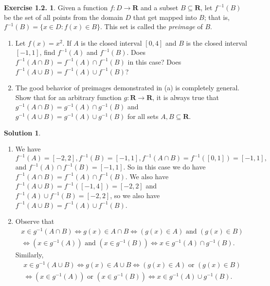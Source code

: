 \documentclass[12pt]{article}
\theoremstyle{definition}
\theoremstyle{exercise}
\newtheorem{exercise}{Exercise 1.2.}
\theoremstyle{solution}
\newtheorem*{solution}{Solution}
\begin{document}
\begin{exercise}
\label{ex:9}
    Given a function \( f : D \to \mathbf{R} \) and a subset \( B \subseteq \mathbf{R} \), let \( f^{-1}(B) \) be the set of all points from the domain \( D \) that get mapped into \( B \); that is, \( f^{-1}(B) = \{ x \in D : f(x) \in B \} \). This set is called the \textit{preimage} of \( B \).
    \begin{enumerate}[label = (\alph*)]
        \item Let \( f(x) = x^2 \). If \( A \) is the closed interval \( [0, 4] \) and \( B \) is the closed interval \( [-1, 1] \), find \( f^{-1}(A) \) and \( f^{-1}(B) \). Does \( f^{-1}(A \cap B) = f^{-1}(A) \cap f^{-1}(B) \) in this case? Does \( f^{-1}(A \cup B) = f^{-1}(A) \cup f^{-1}(B) \)?

        \item The good behavior of preimages demonstrated in (a) is completely general. Show that for an arbitrary function \( g : \mathbf{R} \to \mathbf{R} \), it is always true that \( g^{-1}(A \cap B) = g^{-1}(A) \cap g^{-1}(B) \) and \( g^{-1}(A \cup B) = g^{-1}(A) \cup g^{-1}(B) \) for all sets \( A, B \subseteq \mathbf{R} \).
    \end{enumerate}
\end{exercise}

\begin{solution}
    \begin{enumerate}[label = (\alph*)]
        \item We have \( f^{-1}(A) = [-2, 2], f^{-1}(B) = [-1, 1], f^{-1}(A \cap B) = f^{-1}([0, 1]) = [-1, 1], \) and \( f^{-1}(A) \cap f^{-1}(B) = [-1, 1] \). So in this case we do have \( f^{-1}(A \cap B) = f^{-1}(A) \cap f^{-1}(B) \). We also have \( f^{-1}(A \cup B) = f^{-1}([-1, 4]) = [-2, 2] \) and \( f^{-1}(A) \cup f^{-1}(B) = [-2, 2] \), so we also have \( f^{-1}(A \cup B) = f^{-1}(A) \cup f^{-1}(B) \).

        \item Observe that
        \begin{gather*}
            x \in g^{-1}(A \cap B) \iff g(x) \in A \cap B \iff (g(x) \in A) \text{ and } (g(x) \in B) \\
            \iff (x \in g^{-1}(A)) \text{ and } (x \in g^{-1}(B)) \iff x \in g^{-1}(A) \cap g^{-1}(B).
        \end{gather*}
        Similarly,
        \begin{gather*}
            x \in g^{-1}(A \cup B) \iff g(x) \in A \cup B \iff (g(x) \in A) \text{ or } (g(x) \in B) \\
            \iff (x \in g^{-1}(A)) \text{ or } (x \in g^{-1}(B)) \iff x \in g^{-1}(A) \cup g^{-1}(B).
        \end{gather*}
    \end{enumerate}
\end{solution}
\end{document}
